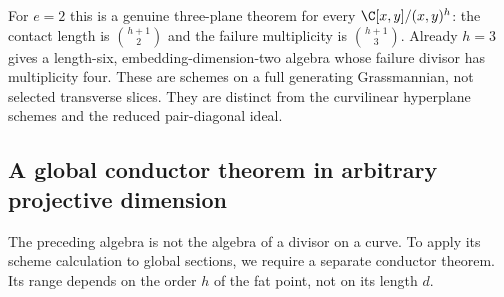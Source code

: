 For $e=2$ this is a genuine three-plane theorem for every
$\C[x,y]/(x,y)^h$: the contact length is $\binom{h+1}{2}$ and the
failure multiplicity is $\binom{h+1}{3}$. Already $h=3$ gives a
length-six, embedding-dimension-two algebra whose failure divisor
has multiplicity four. These are schemes on a full generating
Grassmannian, not selected transverse slices. They are distinct from
the curvilinear hyperplane schemes and the reduced pair-diagonal ideal.

\subsection{A global conductor theorem in arbitrary projective dimension}
The preceding algebra is not the algebra of a divisor on a curve.
To apply its scheme calculation to global sections, we require a
separate conductor theorem. Its range depends on the order $h$ of
the fat point, not on its length $d$.

